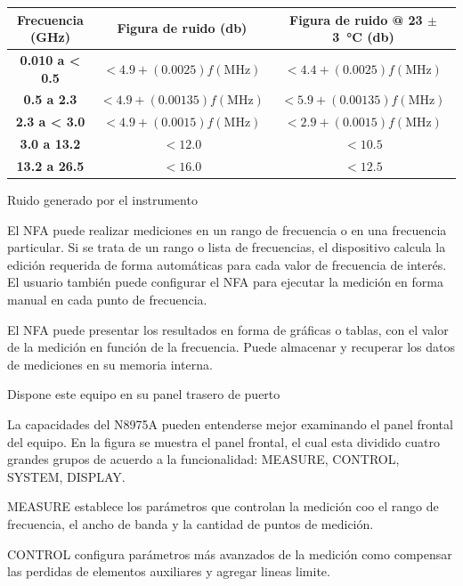 \begin{table}
	\begin{tabular}{ccc}
		\toprule
		\textbf{Frecuencia (\si{\giga\hertz})}
		& \textbf{Figura de ruido (\si{\decibel})} 
		& \textbf{Figura de ruido @ 23 $\pm$ \SI{3}{\degreeCelsius} (\si{\decibel})} \\
		\midrule
		\textbf{0.010 a < 0.5} 
		& $< 4.9 + (0.0025)f(\si{\mega\hertz})$
		& $< 4.4 + (0.0025)f(\si{\mega\hertz})$ \\
		\textbf{0.5 a 2.3} 
		& $< 4.9 + (0.00135)f(\si{\mega\hertz})$
		& $< 5.9 + (0.00135)f(\si{\mega\hertz})$ \\
		\textbf{2.3 a < 3.0} 
		& $< 4.9 + (0.0015)f(\si{\mega\hertz})$
		& $< 2.9 + (0.0015)f(\si{\mega\hertz})$ \\		
		\textbf{3.0 a 13.2} 
		& $< 12.0$
		& $< 10.5$ \\		
		\textbf{13.2 a 26.5} 
		& $< 16.0$
		& $< 12.5$ \\		
		\bottomrule				
	\end{tabular}
\end{table}


Ruido generado por el instrumento \cite{AGI01}



	El NFA puede realizar mediciones en un rango de frecuencia o en una frecuencia particular. Si se trata de un rango o	lista de frecuencias, el dispositivo calcula la edición requerida de forma automáticas para cada valor de frecuencia de interés. El usuario también puede configurar el NFA para ejecutar la medición en forma manual en cada punto de frecuencia. 
	
	El NFA puede presentar los resultados en forma de gráficas o tablas, con el valor de la medición en función de la frecuencia. Puede almacenar y recuperar los datos de mediciones en su memoria interna.
	
	Dispone este equipo en su panel trasero de puerto 
	
	La capacidades del N8975A pueden entenderse mejor examinando el panel frontal del equipo. En la figura se muestra el panel frontal, el cual esta dividido cuatro grandes grupos de acuerdo a la funcionalidad: MEASURE, CONTROL, SYSTEM, DISPLAY.
	
	MEASURE establece los parámetros que controlan la medición coo el rango de frecuencia, el ancho de banda y la cantidad	de puntos de medición.
	
	CONTROL configura parámetros más avanzados de la medición como compensar las perdidas de elementos auxiliares y agregar lineas limite.
	
